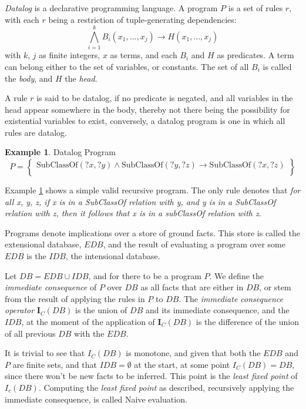 \documentclass[sigconf,screen,review,natbib]{acmart}
\theoremstyle{definition}
\newtheorem{exmp}{Example}[section]
\begin{document}
\textit{Datalog}\cite{datalog} is a declarative programming language. A program $P$ is a set of
rules $r$, with each $r$ being a restriction of tuple-generating dependencies: \[\bigwedge_{i=1}^kB_i(x_1, ..., x_j) \rightarrow H(x_1, ..., x_j)\]
with $k$, $j$ as finite integers, $x$ as terms, and each $B_i$ and $H$ as predicates. A term can belong
either to the set of variables, or constants. The set of all $B_i$ is called the \textit{body}, and $H$ the \textit{head}.

A rule $r$ is said to be datalog, if no predicate is negated, and all variables in the head appear somewhere in the body,
thereby not there being the possibility for existential variables to exist, conversely, a datalog program is one in which
all rules are datalog.

\begin{exmp}{Datalog Program}\label{ex1}
	\[
		P = \left\{  \begin{array}{l}
			\text{SubClassOf}(?x, ?y) \wedge \text{SubClassOf}(?y, ?z) \rightarrow \text{SubClassOf}(?x, ?z) \\
		\end{array}\right\}
	\]
\end{exmp}
Example \ref{ex1} shows a simple valid recursive program. The only rule denotes that \textit{for all x, y, z, if x is
	in a SubClassOf relation with y, and y is in a SubClassOf relation with z, then it follows that x is in a subClassOf
	relation with z}.

Programs denote implications over a store of ground facts. This store is called the extensional database, $EDB$, and the result
of evaluating a program over some $EDB$ is the $IDB$, the intensional database.

Let $DB = EDB \cup IDB$, and for there to be a program $P$. We define the \textit{immediate consequence} of $P$ over $DB$ as
all facts that are either in $DB$, or stem from the result of applying the rules in $P$ to $DB$. The \textit{immediate consequence operator}
$\textbf{I}_C(DB)$ is the union of $DB$ and its immediate consequence, and the $IDB$, at the moment of the
application of $\textbf{I}_C(DB)$ is the difference of the union of all previous $DB$ with the $EDB$.

It is trivial to see that $I_C(DB)$ is monotone, and given that both the $EDB$ and $P$ are finite sets, and
that $IDB = \emptyset$ at the start, at some point $I_C(DB) = DB$, since there won't be new facts to be inferred. This
point is the \textit{least fixed point} of $I_c(DB)$\cite{datalog}. Computing the \textit{least fixed point} as
described, recursively applying the immediate consequence, is called Naive evaluation.
\end{document}
